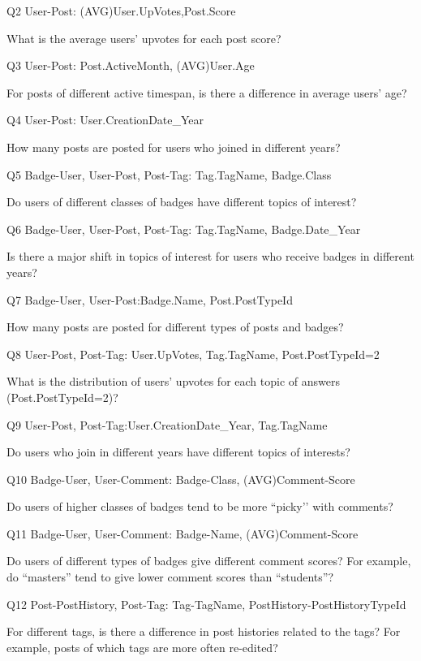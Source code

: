 \documentclass[letterpaper,12pt,titlepage,oneside,final]{book}
\begin{document}
Q2 \hspace{3mm} User-Post: (AVG)User.UpVotes,Post.Score

What is the average users' upvotes for each post score?

Q3 \hspace{3mm} User-Post: Post.ActiveMonth, (AVG)User.Age

For posts of different active timespan, is there a difference in average users' age?

Q4 \hspace{3mm} User-Post: User.CreationDate\_Year

How many posts are posted for users who joined in different years?

Q5 \hspace{3mm} Badge-User, User-Post, Post-Tag: Tag.TagName, Badge.Class

Do users of different classes of badges have different topics of interest?

Q6 \hspace{3mm} Badge-User, User-Post, Post-Tag: Tag.TagName, Badge.Date\_Year

Is there a major shift in topics of interest for users who receive badges in different years?

Q7 \hspace{3mm} Badge-User, User-Post:Badge.Name, Post.PostTypeId

How many posts are posted for different types of posts and badges?

Q8 \hspace{3mm} User-Post, Post-Tag: User.UpVotes, Tag.TagName, Post.PostTypeId=2

What is the distribution of users' upvotes for each topic of answers (Post.PostTypeId=2)?

Q9 \hspace{3mm} User-Post, Post-Tag:User.CreationDate\_Year, Tag.TagName

Do users who join in different years have different topics of interests? 

Q10 \hspace{1.3mm} Badge-User, User-Comment: Badge-Class, (AVG)Comment-Score

Do users of higher classes of badges tend to be more ``picky’’ with comments?

Q11 \hspace{1.3mm} Badge-User, User-Comment: Badge-Name, (AVG)Comment-Score

Do users of different types of badges give different comment scores? For example, do ``masters'' tend to give lower comment scores than ``students''?

Q12 \hspace{1.3mm} Post-PostHistory, Post-Tag: Tag-TagName, PostHistory-PostHistoryTypeId

For different tags, is there a difference in post histories related to the tags? For example, posts of which tags are more often re-edited?
\end{document}
